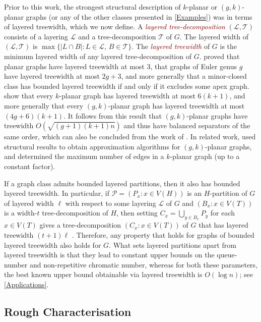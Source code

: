 \documentclass{patmorin}
\theoremstyle{plain}
\theoremstyle{definition}
\newcommand{\defin}[1]{\textcolor{Maroon}{\emph{#1}}}
\newcommand{\PP}{\mathcal{P}}
\begin{document}
Prior to this work, the strongest structural description of $k$-planar or $(g,k)$-planar graphs (or any of the other classes presented in \cref{Examples}) was in terms of layered treewidth, which we now define.  A \defin{layered tree-decomposition} $(\mathcal{L},\mathcal{T})$ consists of a layering $\mathcal{L}$ and a tree-decomposition $\mathcal{T}$ of $G$. The layered width of $(\mathcal{L},\mathcal{T})$ is $\max\{|L\cap B|: L\in \mathcal{L},\, B\in \mathcal{T}\}$.  The \defin{layered treewidth} of $G$ is the minimum layered width of any layered tree-decomposition of $G$. \citet{dujmovic.morin.ea:layered} proved that planar graphs have layered treewidth at most 3, that graphs of Euler genus $g$ have layered treewidth at most $2g+3$, and more generally that a minor-closed class has bounded layered treewidth if and only if it excludes some apex graph. \citet{dujmovic.eppstein.ea:structure} show that every $k$-planar graph has layered treewidth at most $6(k+1)$, and more generally that every $(g,k)$-planar graph has layered treewidth at most $(4g+6)(k+1)$. It follows from this result that $(g,k)$-planar graphs have treewidth $O(\sqrt{(g+1)(k+1)n})$ and thus have balanced separators of the same order, which can also be concluded from the work of \citet{FP08}. In related work, \citet{grigoriev.bodlaender:algorithms} used structural results to obtain approximation algorithms for $(g,k)$-planar graphs, and \citet{PachToth97} determined the maximum number of edges in a $k$-planar graph (up to a constant factor).

If a graph class admits bounded layered partitions, then it also has bounded layered treewidth. In particular, if $\PP=(P_x:x\in V(H))$ is an $H$-partition of $G$ of layered width $\ell$ with respect to some layering $\mathcal{L}$ of $G$ and $(B_x:x\in V(T))$ is a width-$t$ tree-decomposition of $H$, then setting $C_x = \bigcup_{y\in B_x} P_y$ for each $x\in V(T)$ gives a tree-decomposition $(C_x:x\in V(T))$ of $G$ that has layered treewidth $(t+1)\ell$ \cite{DJMMUW20}. Therefore, any property that holds for graphs of bounded layered treewidth also holds for $G$. What sets layered partitions apart from layered treewidth is that they lead to constant upper bounds on the queue-number  and non-repetitive chromatic number, whereas for both these parameters, the best known upper bound obtainable via layered treewidth is $O(\log n)$; see \cref{Applications}.


\subsection{Rough Characterisation}
\label{Characterisation}
\end{document}
